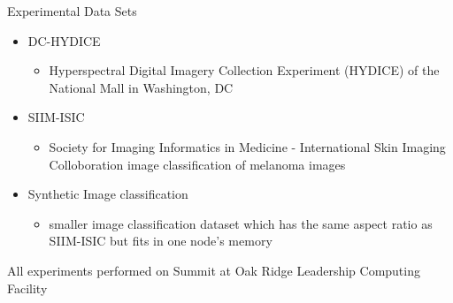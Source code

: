 \documentclass{beamer}
\begin{document}
\begin{frame}{Experimental Data Sets}
    \begin{itemize}
        \item DC-HYDICE
        \begin{itemize}
            \item Hyperspectral Digital Imagery Collection Experiment (HYDICE) of the National Mall in Washington, DC
        \end{itemize}
        \vfill
        \item SIIM-ISIC
        \begin{itemize}
            \item Society for Imaging Informatics in Medicine - International Skin Imaging Colloboration image classification of melanoma images
        \end{itemize}
        \vfill
        \item Synthetic Image classification
        \begin{itemize}
            \item smaller image classification dataset which has the same aspect ratio as SIIM-ISIC but fits in one node's memory
        \end{itemize}
    \end{itemize}
    \vfill
    \begin{center}
    \scriptsize
    	All experiments performed on Summit at Oak Ridge Leadership Computing Facility
    \end{center}
\end{frame}
\end{document}
